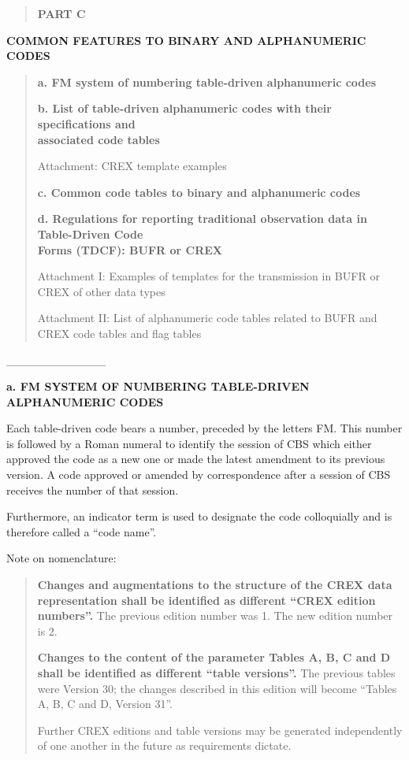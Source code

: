 \begin{quote}
\textbf{PART C}
\end{quote}

\textbf{COMMON FEATURES TO BINARY AND ALPHANUMERIC CODES}

\begin{quote}
\textbf{a. FM system of numbering table-driven alphanumeric codes}

\textbf{b. List of table-driven alphanumeric codes with their specifications and\\
associated code tables}

Attachment: CREX template examples

\textbf{c. Common code tables to binary and alphanumeric codes}

\textbf{d. Regulations for reporting traditional observation data in Table-Driven Code\\
Forms (TDCF): BUFR or CREX}

Attachment I: Examples of templates for the transmission in BUFR or\\
CREX of other data types

Attachment II: List of alphanumeric code tables related to BUFR and\\
CREX code tables and flag tables
\end{quote}

\_\_\_\_\_\_\_\_\_\_\_\_

\textbf{a. FM SYSTEM OF NUMBERING TABLE-DRIVEN ALPHANUMERIC CODES}

Each table-driven code bears a number, preceded by the letters FM. This number is followed by a Roman numeral to identify the session of CBS which either approved the code as a new one or made the latest amendment to its previous version. A code approved or amended by correspondence after a session of CBS receives the number of that session.

Furthermore, an indicator term is used to designate the code colloquially and is therefore called a ``code name''.

Note on nomenclature:

\begin{quote}
\textbf{Changes and augmentations to the structure of the CREX data representation shall be identified as different ``CREX edition numbers''.} The previous edition number was 1. The new edition number is 2.

\textbf{Changes to the content of the parameter Tables A, B, C and D shall be identified as different ``table versions''.} The previous tables were Version 30; the changes described in this edition will become ``Tables A, B, C and D, Version 31''.

Further CREX editions and table versions may be generated independently of one another in the future as requirements dictate.
\end{quote}

